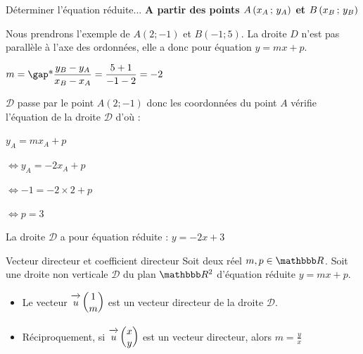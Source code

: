 \documentclass[10pt,a4paper,openany,twoside, prof]{book}
\begin{document}
\begin{methode}{Déterminer l'équation réduite...}{}
\textbf{A partir des points $A\left(x_A\,;\,y_A\right)$ et $B\left(x_B\,;\,y_B\right)$}

\medskip
Nous prendrons l'exemple de $A(2;-1)$ et $B(-1;5)$.
La droite $D$ n'est pas parallèle à l'axe des ordonnées, elle a donc pour équation $y=mx+p$.

\medskip
\hspace{5mm}$m=\troum{\dfrac{y_B-y_A}{x_B-x_A}=\dfrac{5+1}{-1-2}=-2}$

\medskip
\noindent $\mathcal{D}$ passe par le point $A(2;-1)$ donc les coordonnées du point $A$ vérifie l'équation de la droite $\mathcal{D}$ d'où :

\begin{reponse}
   \hspace{5mm}\phantom{$\Longleftrightarrow$} $y_A=mx_A+p$

   \hspace{5mm}$\Longleftrightarrow y_A=-2x_A+p$

   \hspace{5mm}$\Longleftrightarrow -1=-2\times2+p$

   \hspace{5mm}$\Longleftrightarrow p=3$
\end{reponse}

\medskip
La droite $\mathcal{D}$ a pour équation réduite : $y=-2x+3$
\end{methode}


\begin{prop}{Vecteur directeur et coefficient directeur}{}
   Soit deux réel $m,p\in\R$. Soit une droite non verticale $\mathcal{D}$ du plan $\R^2$ d'équation réduite $y = mx+p$.

   \begin{itemize}
      \item
   Le vecteur $\overrightarrow{\,\mathstrut u\,} \begin{pmatrix}1\\m\end{pmatrix}$ est un vecteur directeur de la droite $\mathcal{D}$.
      \item Réciproquement, si $\overrightarrow{\,\mathstrut u\,}\begin{pmatrix}x\\y\end{pmatrix}$ est un vecteur directeur, alors $m=\frac{y}{x}$
   \end{itemize}
\end{prop}

\end{document}
